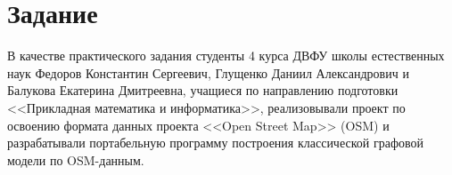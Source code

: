\chapter*{Задание}
\noindent\indent В качестве практического задания студенты 4 курса ДВФУ
школы естественных наук Федоров Константин Сергеевич, Глущенко Даниил
Александрович и Балукова Екатерина Дмитреевна, учащиеся по направлению подготовки <<Прикладная математика
и информатика>>, реализовывали проект по освоению формата данных проекта
<<Open Street Map>> (OSM) и разрабатывали портабельную программу построения
классической графовой модели по OSM-данным.
